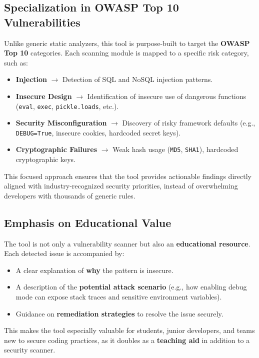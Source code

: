 \subsection{Specialization in OWASP Top 10 Vulnerabilities}
Unlike generic static analyzers, this tool is purpose-built to target the \textbf{OWASP Top 10} categories. Each scanning module is mapped to a specific risk category, such as:
\begin{itemize}
    \item \textbf{Injection} $\rightarrow$ Detection of SQL and NoSQL injection patterns.
    \item \textbf{Insecure Design} $\rightarrow$ Identification of insecure use of dangerous functions (\texttt{eval}, \texttt{exec}, \texttt{pickle.loads}, etc.).
    \item \textbf{Security Misconfiguration} $\rightarrow$ Discovery of risky framework defaults (e.g., \texttt{DEBUG=True}, insecure cookies, hardcoded secret keys).
    \item \textbf{Cryptographic Failures} $\rightarrow$ Weak hash usage (\texttt{MD5}, \texttt{SHA1}), hardcoded cryptographic keys.
\end{itemize}

This focused approach ensures that the tool provides actionable findings directly aligned with industry-recognized security priorities, instead of overwhelming developers with thousands of generic rules.

\subsection{Emphasis on Educational Value}
The tool is not only a vulnerability scanner but also an \textbf{educational resource}. Each detected issue is accompanied by:
\begin{itemize}
    \item A clear explanation of \textbf{why} the pattern is insecure.
    \item A description of the \textbf{potential attack scenario} (e.g., how enabling debug mode can expose stack traces and sensitive environment variables).
    \item Guidance on \textbf{remediation strategies} to resolve the issue securely.
\end{itemize}

This makes the tool especially valuable for students, junior developers, and teams new to secure coding practices, as it doubles as a \textbf{teaching aid} in addition to a security scanner.


